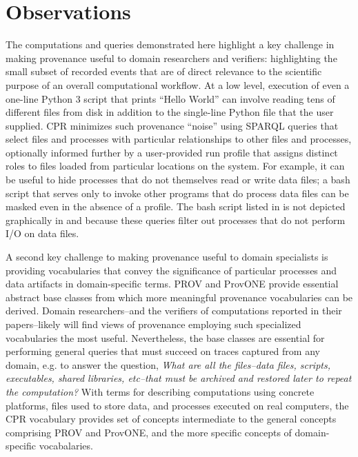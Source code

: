 \section{Observations}

The computations and queries demonstrated here highlight a key challenge in making provenance useful to domain researchers and verifiers: highlighting the small subset of recorded events that are of direct relevance to the scientific purpose of an overall computational workflow. At a low level, execution of even a one-line Python 3 script that prints ``Hello World'' can involve reading tens of different files from disk in addition to the single-line Python file that the user supplied. CPR minimizes such provenance ``noise'' using SPARQL queries that select files and processes with particular relationships to other files and processes, optionally informed further by a user-provided run profile that assigns distinct roles to files loaded from particular locations on the system.  For example, it can be useful to hide processes that do not themselves read or write data files; a bash script that serves only to invoke other programs that do process data files can be masked even in the absence of a profile. The bash script listed in  is not depicted graphically in  and  because these queries filter out processes that do not perform I/O on data files.

A second key challenge to making provenance useful to domain specialists is providing vocabularies that convey the significance of particular processes and data artifacts in domain-specific terms. PROV and ProvONE provide essential abstract base classes from which more meaningful provenance vocabularies can be derived.  Domain researchers--and the verifiers of computations reported in their papers--likely will find views of provenance employing such specialized vocabularies the most useful. Nevertheless, the base classes are essential for performing general queries that must succeed on traces captured from any domain, e.g. to answer the question, \emph{What are all the files--data files, scripts, executables, shared libraries, etc--that must be archived and restored later to repeat the computation?} With terms for describing computations using concrete platforms, files used to store data, and processes executed on real computers, the CPR vocabulary provides set of concepts intermediate to the general concepts comprising PROV and ProvONE, and the more specific concepts of domain-specific vocabalaries. 

